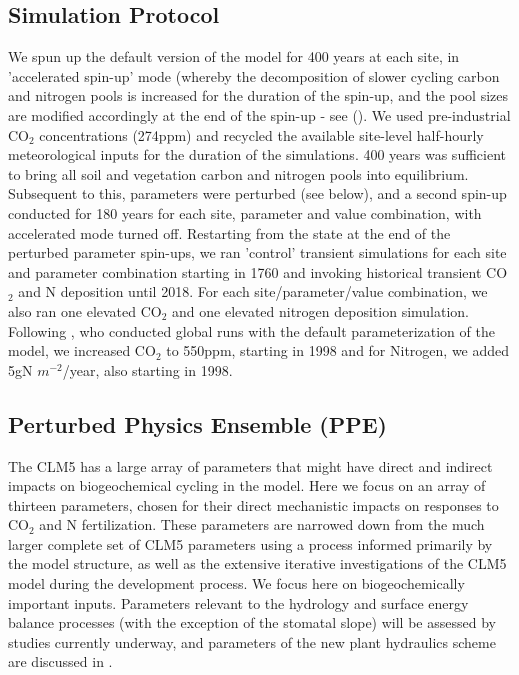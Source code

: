 \documentclass[draft,linenumbers]{agujournal}
\begin{document}
\subsection{Simulation Protocol}
We spun up the default version of the model for 400 years at each site, in 'accelerated spin-up' mode (whereby the decomposition of slower cycling carbon and nitrogen pools is increased for the duration of the spin-up, and the pool sizes are modified accordingly at the end of the spin-up - see (\cite{lawrence2018}). We used pre-industrial CO$_{2}$ concentrations (274ppm) and recycled the available site-level half-hourly meteorological inputs for the duration of the simulations. 400 years was sufficient to bring all soil and vegetation carbon and nitrogen pools into equilibrium. Subsequent to this, parameters were perturbed (see below), and a second spin-up conducted for 180 years for each site, parameter and value combination, with accelerated mode turned off. Restarting from the state at the end of the perturbed parameter spin-ups, we ran 'control' transient simulations for each site and parameter combination starting in 1760 and invoking historical transient CO$_{2}$ and N deposition until 2018. For each site/parameter/value combination, we also ran one elevated CO$_{2}$ and one elevated nitrogen deposition simulation. Following \cite{wieder2019}, who conducted global runs with the default parameterization of the model, we increased CO$_{2}$ to 550ppm, starting in 1998 and for Nitrogen, we added 5gN $m^{-2}$/year, also starting in 1998. 

\subsection{Perturbed Physics Ensemble (PPE)}
The CLM5 has a large array of parameters that might have direct and indirect impacts on biogeochemical cycling in the model.  Here we focus on an array of thirteen parameters, chosen for their direct mechanistic impacts on responses to CO$_{2}$ and N fertilization. These parameters are narrowed down from the much larger complete set of CLM5 parameters using a process informed primarily by the model structure, as well as the extensive iterative investigations of the CLM5 model during the development process.  We focus here on biogeochemically important inputs. Parameters relevant to the hydrology and surface energy balance processes (with the exception of the stomatal slope) will be assessed by studies currently underway, and parameters of the new plant hydraulics scheme are discussed in \cite{kennedy2019}.
\end{document}
